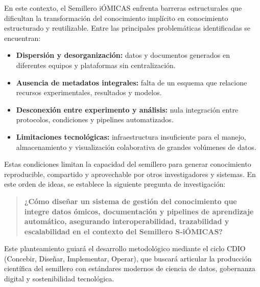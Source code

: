 En este contexto, el Semillero iÓMICAS enfrenta barreras estructurales que dificultan la transformación del conocimiento implícito en conocimiento estructurado y reutilizable. Entre las principales problemáticas identificadas se encuentran:

\begin{itemize}
  \item \textbf{Dispersión y desorganización:} datos y documentos generados en diferentes equipos y plataformas sin centralización.
  \item \textbf{Ausencia de metadatos integrales:} falta de un esquema que relacione recursos experimentales, resultados y modelos.
  \item \textbf{Desconexión entre experimento y análisis:} nula integración entre protocolos, condiciones y pipelines automatizados.
  \item \textbf{Limitaciones tecnológicas:} infraestructura insuficiente para el manejo, almacenamiento y visualización colaborativa de grandes volúmenes de datos.
\end{itemize}

Estas condiciones limitan la capacidad del semillero para generar conocimiento reproducible, compartido y aprovechable por otros investigadores y sistemas. En este orden de ideas, se establece la siguiente pregunta de investigación:

\begin{quote}
    \textbf{¿Cómo diseñar un sistema de gestión del conocimiento que integre datos ómicos, documentación y pipelines de aprendizaje automático, asegurando interoperabilidad, trazabilidad y escalabilidad en el contexto del Semillero S‑iÓMICAS?}
\end{quote}

Este planteamiento guiará el desarrollo metodológico mediante el ciclo CDIO (Concebir, Diseñar, Implementar, Operar), que buscará articular la producción científica del semillero con estándares modernos de ciencia de datos, gobernanza digital y sostenibilidad tecnológica.
